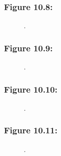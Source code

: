 \documentclass[t]{beamer}\usepackage[]{graphicx}\usepackage[]{color}
\begin{document}
\begin{frame}[label=Figure_10_8]
\frametitle{Figure 10.8: }
\begin{figure}[t]
\begin{minipage}[b]{\textwidth}
\centering

\caption{.}
\end{minipage}
\end{figure}
\end{frame}


\begin{frame}[label=Figure_10_9]
\frametitle{Figure 10.9: }
\begin{figure}[t]
\begin{minipage}[b]{\textwidth}
\centering

\caption{.}
\end{minipage}
\end{figure}
\end{frame}


\begin{frame}[label=Figure_10_10]
\frametitle{Figure 10.10: }
\begin{figure}[t]
\begin{minipage}[b]{\textwidth}
\centering

\caption{.}
\end{minipage}
\end{figure}
\end{frame}


\begin{frame}[label=Figure_10_11]
\frametitle{Figure 10.11: }
\begin{figure}[t]
\begin{minipage}[b]{\textwidth}
\centering

\caption{.}
\end{minipage}
\end{figure}
\end{frame}
\end{document}
